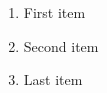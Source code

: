 \documentclass{beamer}
\begin{document}
\begin{frame}
\begin{enumerate}
  \item First item
  \item<alert@+-> Second item
  \item Last item
\end{enumerate}
\end{frame}
\end{document}
